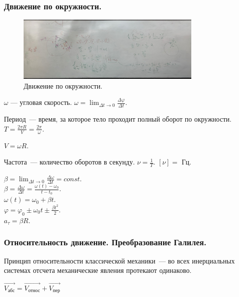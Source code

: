 \documentclass{article}
\begin{document}
	\subsubsection{Движение по окружности.}
	\begin{figure}[H]
		\includegraphics[height=120px]{extra-materials/Скорости_Вектора_3}
		\caption{Движение по окружности.}
	\end{figure}
	\begin{definition}
		$\omega$ --- угловая скорость. $\omega = \lim_{\varDelta t \rightarrow 0} \frac{\varDelta \varphi}{\varDelta t}$.
	\end{definition}
	\begin{definition}
		Период~--- время, за которое тело проходит полный оборот по окружности. $T = \frac{2\pi R}{V} = \frac{2\pi}{\omega}$.
	\end{definition}
	\begin{statement}
		$V = \omega R$.
	\end{statement}
	\begin{definition}
		Частота~--- количество оборотов в секунду. $\nu = \frac{1}{T}$. $[\nu] = $ Гц.
	\end{definition}
	\noindent
	$\beta = \lim_{\varDelta t \rightarrow 0} \frac{\varDelta \omega}{\varDelta t} = const$. \\
	$\beta = \frac{\varDelta \omega}{\varDelta t} = \frac{\omega(t) - \omega_0}{t - t_0}$. \\
	$\omega(t) = \omega_0 + \beta t$. \\
	$\varphi = \varphi_0 \pm \omega_0t \pm \frac{\beta t^2}{2}$. \\
	$a_{\tau} = \beta R$.
	\subsubsection{Относительность движение. Преобразование Галилея.}
	\begin{definition}
		Принцип относительности классической механики~--- во всех инерциальных системах отсчета механические явления протекают одинаково.
	\end{definition}
	\noindent
	$\vec{V_{\text{абс}}} = \vec{V_{\text{относ}}} + \vec{V_{\text{пер}}}$
\end{document}
